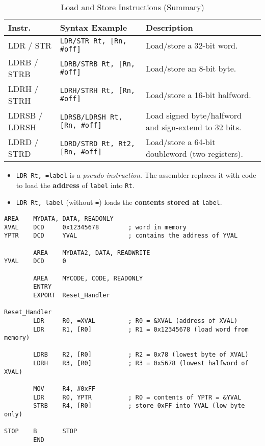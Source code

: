 \begin{table}[H]
\centering
\caption{Load and Store Instructions (Summary)}
\small
\begin{tabularx}{\linewidth}{@{}l l X@{}}
\toprule
\textbf{Instr.} & \textbf{Syntax Example} & \textbf{Description} \\
\midrule
LDR / STR       & \texttt{LDR/STR Rt, [Rn, \#off]} & Load/store a 32-bit word. \\
LDRB / STRB     & \texttt{LDRB/STRB Rt, [Rn, \#off]} & Load/store an 8-bit byte. \\
LDRH / STRH     & \texttt{LDRH/STRH Rt, [Rn, \#off]} & Load/store a 16-bit halfword. \\
LDRSB / LDRSH   & \texttt{LDRSB/LDRSH Rt, [Rn, \#off]} & Load signed byte/halfword and sign-extend to 32 bits. \\
LDRD / STRD     & \texttt{LDRD/STRD Rt, Rt2, [Rn, \#off]} & Load/store a 64-bit doubleword (two registers). \\
\bottomrule
\end{tabularx}
\vspace{2pt}
\end{table}

\begin{itemize}[nosep]
  \item \texttt{LDR Rt, =label} is a \emph{pseudo-instruction}. The assembler replaces it with code to load the \textbf{address} of \texttt{label} into \texttt{Rt}.
  \item \texttt{LDR Rt, label} (without \texttt{=}) loads the \textbf{contents stored at} \texttt{label}.
\end{itemize}
\newpage
\begin{lstlisting}[caption={Examples of Load and Store Instructions}]
        AREA    MYDATA, DATA, READONLY
XVAL    DCD     0x12345678        ; word in memory
YPTR    DCD     YVAL              ; contains the address of YVAL

        AREA    MYDATA2, DATA, READWRITE
YVAL    DCD     0

        AREA    MYCODE, CODE, READONLY
        ENTRY
        EXPORT  Reset_Handler

Reset_Handler
        LDR     R0, =XVAL         ; R0 = &XVAL (address of XVAL)
        LDR     R1, [R0]          ; R1 = 0x12345678 (load word from memory)

        LDRB    R2, [R0]          ; R2 = 0x78 (lowest byte of XVAL)
        LDRH    R3, [R0]          ; R3 = 0x5678 (lowest halfword of XVAL)

        MOV     R4, #0xFF
        LDR     R0, YPTR          ; R0 = contents of YPTR = &YVAL
        STRB    R4, [R0]          ; store 0xFF into YVAL (low byte only)

STOP    B       STOP
        END
\end{lstlisting}
